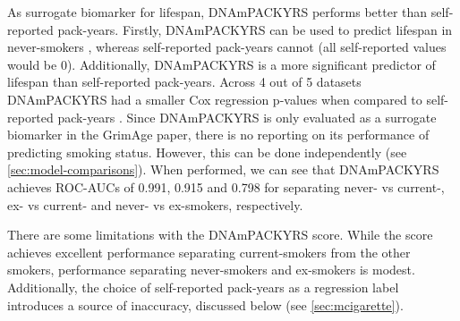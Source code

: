 \documentclass[draft]{article} %
\begin{document}
As surrogate biomarker for lifespan, DNAmPACKYRS performs better than self-reported pack-years. Firstly, DNAmPACKYRS can be used to predict lifespan in never-smokers \cite{lu2019dna}, whereas self-reported pack-years cannot (all self-reported values would be 0). Additionally, DNAmPACKYRS is a more significant predictor of lifespan than self-reported pack-years. Across 4 out of 5 datasets DNAmPACKYRS had a smaller Cox regression p-values when compared to self-reported pack-years \cite{lu2019dna}. Since DNAmPACKYRS is only evaluated as a surrogate biomarker in the GrimAge paper, there is no reporting on its performance of predicting smoking status. However, this can be done independently (see \ref{sec:model-comparisons}). When performed, we can see that DNAmPACKYRS achieves ROC-AUCs of 0.991, 0.915 and 0.798 for separating never- vs current-, ex- vs current- and never- vs ex-smokers, respectively.

There are some limitations with the DNAmPACKYRS score. While the score achieves excellent performance separating current-smokers from the other smokers, performance separating never-smokers and ex-smokers is modest. Additionally, the choice of self-reported pack-years as a regression label introduces a source of inaccuracy, discussed below (see \ref{sec:mcigarette}).

\end{document}
